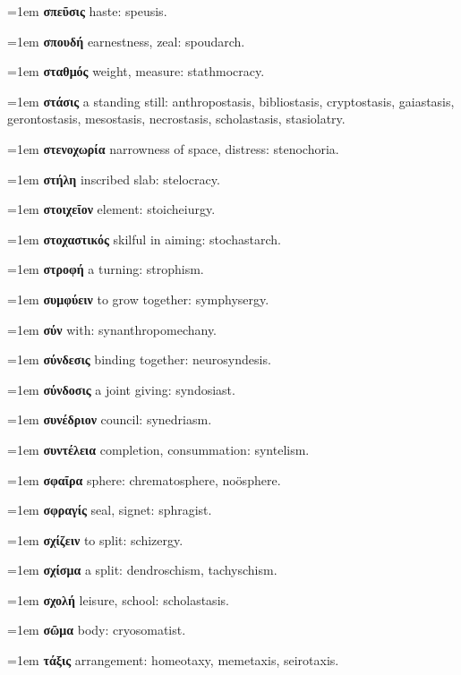 \hangindent=1em \textbf{σπεῦσις} haste: speusis.\par
\hangindent=1em \textbf{σπουδή} earnestness, zeal: spoudarch.\par
\hangindent=1em \textbf{σταθμός} weight, measure: stathmocracy.\par
\hangindent=1em \textbf{στάσις} a standing still: anthropostasis, bibliostasis, cryptostasis, gaiastasis, gerontostasis, mesostasis, necrostasis, scholastasis, stasiolatry.\par
\hangindent=1em \textbf{στενοχωρία} narrowness of space, distress: stenochoria.\par
\hangindent=1em \textbf{στήλη} inscribed slab: stelocracy.\par
\hangindent=1em \textbf{στοιχεῖον} element: stoicheiurgy.\par
\hangindent=1em \textbf{στοχαστικός} skilful in aiming: stochastarch.\par
\hangindent=1em \textbf{στροφή} a turning: strophism.\par
\hangindent=1em \textbf{συμφύειν} to grow together: symphysergy.\par
\hangindent=1em \textbf{σύν} with: synanthropomechany.\par
\hangindent=1em \textbf{σύνδεσις} binding together: neurosyndesis.\par
\hangindent=1em \textbf{σύνδοσις} a joint giving: syndosiast.\par
\hangindent=1em \textbf{συνέδριον} council: synedriasm.\par
\hangindent=1em \textbf{συντέλεια} completion, consummation: syntelism.\par
\hangindent=1em \textbf{σφαῖρα} sphere: chrematosphere, noösphere.\par
\hangindent=1em \textbf{σφραγίς} seal, signet: sphragist.\par
\hangindent=1em \textbf{σχίζειν} to split: schizergy.\par
\hangindent=1em \textbf{σχίσμα} a split: dendroschism, tachyschism.\par
\hangindent=1em \textbf{σχολή} leisure, school: scholastasis.\par
\hangindent=1em \textbf{σῶμα} body: cryosomatist.\par
\hangindent=1em \textbf{τάξις} arrangement: homeotaxy, memetaxis, seirotaxis.\par
